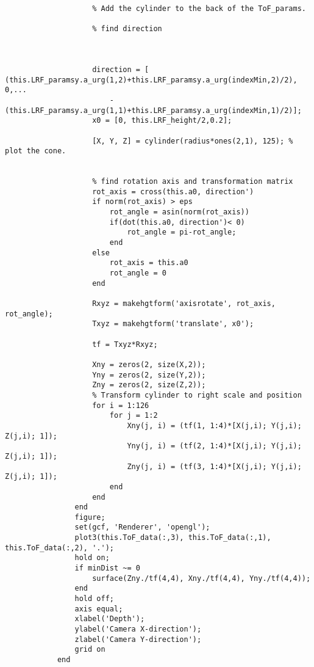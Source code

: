 \begin{lstlisting}
                    % Add the cylinder to the back of the ToF_params.
                    
                    % find direction
                    
                    
                    
                    direction = [ (this.LRF_paramsy.a_urg(1,2)+this.LRF_paramsy.a_urg(indexMin,2)/2), 0,...
                        -(this.LRF_paramsy.a_urg(1,1)+this.LRF_paramsy.a_urg(indexMin,1)/2)];
                    x0 = [0, this.LRF_height/2,0.2];
                 
                    [X, Y, Z] = cylinder(radius*ones(2,1), 125); % plot the cone.
                    
                    
                    % find rotation axis and transformation matrix
                    rot_axis = cross(this.a0, direction')
                    if norm(rot_axis) > eps
                        rot_angle = asin(norm(rot_axis))
                        if(dot(this.a0, direction')< 0)
                            rot_angle = pi-rot_angle;
                        end
                    else
                        rot_axis = this.a0
                        rot_angle = 0
                    end
                    
                    Rxyz = makehgtform('axisrotate', rot_axis, rot_angle);
                    Txyz = makehgtform('translate', x0');
                    
                    tf = Txyz*Rxyz;
                    
                    Xny = zeros(2, size(X,2));
                    Yny = zeros(2, size(Y,2));
                    Zny = zeros(2, size(Z,2));
                    % Transform cylinder to right scale and position
                    for i = 1:126
                        for j = 1:2
                            Xny(j, i) = (tf(1, 1:4)*[X(j,i); Y(j,i); Z(j,i); 1]);
                            Yny(j, i) = (tf(2, 1:4)*[X(j,i); Y(j,i); Z(j,i); 1]);
                            Zny(j, i) = (tf(3, 1:4)*[X(j,i); Y(j,i); Z(j,i); 1]);
                        end
                    end
                end
                figure;
                set(gcf, 'Renderer', 'opengl');
                plot3(this.ToF_data(:,3), this.ToF_data(:,1), this.ToF_data(:,2), '.');
                hold on;
                if minDist ~= 0
                    surface(Zny./tf(4,4), Xny./tf(4,4), Yny./tf(4,4));
                end
                hold off;
                axis equal;
                xlabel('Depth');
                ylabel('Camera X-direction');
                zlabel('Camera Y-direction');
                grid on
            end
        

\end{lstlisting}
